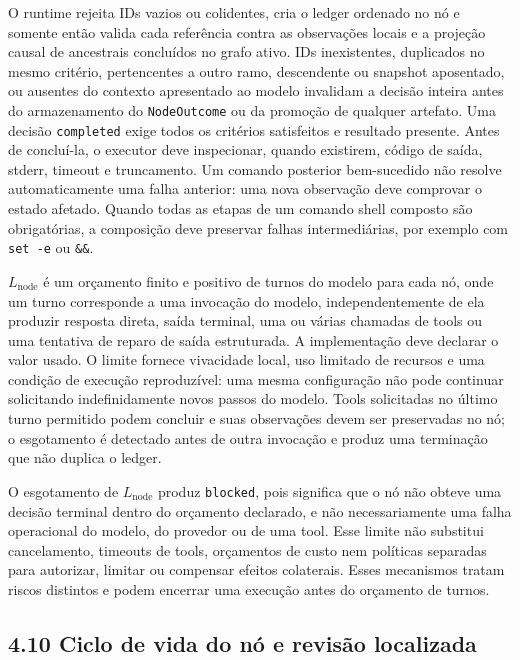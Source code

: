 \documentclass[12pt,a4paper]{article}
\begin{document}
O runtime rejeita IDs vazios ou colidentes, cria o ledger ordenado no nó e somente então valida cada referência contra as observações locais e a projeção causal de ancestrais concluídos no grafo ativo. IDs inexistentes, duplicados no mesmo critério, pertencentes a outro ramo, descendente ou snapshot aposentado, ou ausentes do contexto apresentado ao modelo invalidam a decisão inteira antes do armazenamento do \texttt{NodeOutcome} ou da promoção de qualquer artefato. Uma decisão \texttt{completed} exige todos os critérios satisfeitos e resultado presente. Antes de concluí-la, o executor deve inspecionar, quando existirem, código de saída, stderr, timeout e truncamento. Um comando posterior bem-sucedido não resolve automaticamente uma falha anterior: uma nova observação deve comprovar o estado afetado. Quando todas as etapas de um comando shell composto são obrigatórias, a composição deve preservar falhas intermediárias, por exemplo com \texttt{set -e} ou \texttt{\&\&}.

\(L_{\mathrm{node}}\) é um orçamento finito e positivo de turnos do modelo para cada nó, onde um turno corresponde a uma invocação do modelo, independentemente de ela produzir resposta direta, saída terminal, uma ou várias chamadas de tools ou uma tentativa de reparo de saída estruturada. A implementação deve declarar o valor usado. O limite fornece vivacidade local, uso limitado de recursos e uma condição de execução reproduzível: uma mesma configuração não pode continuar solicitando indefinidamente novos passos do modelo. Tools solicitadas no último turno permitido podem concluir e suas observações devem ser preservadas no nó; o esgotamento é detectado antes de outra invocação e produz uma terminação que não duplica o ledger.

O esgotamento de \(L_{\mathrm{node}}\) produz \texttt{blocked}, pois significa que o nó não obteve uma decisão terminal dentro do orçamento declarado, e não necessariamente uma falha operacional do modelo, do provedor ou de uma tool. Esse limite não substitui cancelamento, timeouts de tools, orçamentos de custo nem políticas separadas para autorizar, limitar ou compensar efeitos colaterais. Esses mecanismos tratam riscos distintos e podem encerrar uma execução antes do orçamento de turnos.




\subsection*{4.10 Ciclo de vida do nó e revisão localizada}
\end{document}
